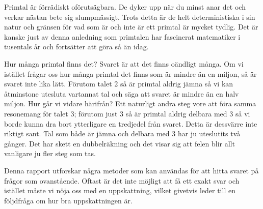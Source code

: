 
Primtal är förrädiskt oförutsägbara.
De dyker upp när du minst anar det och verkar nästan bete sig slumpmässigt.
Trots detta är de helt deterministiska i sin natur och gränsen för vad som är och inte är ett primtal är mycket tydlig.
Det är kanske just av denna anledning som primtalen har fascinerat matematiker i tusentals år och fortsätter att göra så än idag.

Hur många primtal finns det? Svaret är att det finns oändligt många.
Om vi istället frågar oss hur många primtal det finns som är mindre än en miljon, så är svaret inte lika lätt.
Förutom talet 2 så är primtal aldrig jämna så vi kan åtminstone utesluta vartannat tal och säga att svaret är mindre än en halv miljon.
Hur går vi vidare härifrån?
Ett naturligt andra steg vore att föra samma resonemang för talet 3;
förutom just 3 så är primtal aldrig delbara med 3 så vi borde kunna dra bort ytterligare en tredjedel från svaret.
Detta är dessvärre inte riktigt sant.
Tal som både är jämna och delbara med 3 har ju uteslutits två gånger.
Det har skett en dubbelräkning och det visar sig att felen blir allt vanligare ju fler steg som tas.

Denna rapport utforskar några metoder som kan användas för att hitta svaret på frågor som ovanstående.
Oftast är det inte möjligt att få ett exakt svar och istället måste vi nöja oss med en uppskattning,
vilket givetvis leder till en följdfråga om hur bra uppskattningen är.

